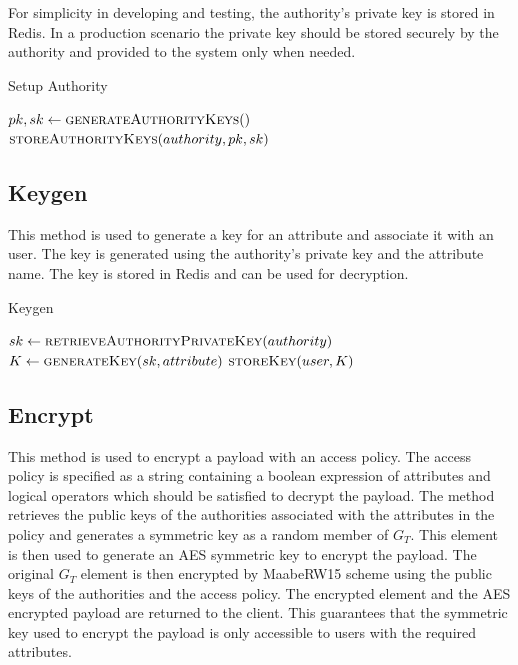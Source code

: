\documentclass[cic,tc,english]{iiufrgs}
\begin{document}
            For simplicity in developing and testing, the authority's private key is stored in Redis. In a production scenario the private key should be stored securely by the authority and provided to the system only when needed.

            \begin{algorithm}
                \caption{Setup Authority}
                \label{alg:setup_authority}
                \begin{algorithmic}[1]
                    \State $pk, sk \gets \textsc{generateAuthorityKeys}()$
                    \State $\textsc{storeAuthorityKeys}(authority, pk, sk)$
                \EndProcedure
                \end{algorithmic}
            \end{algorithm}

        \subsection{Keygen}
            This method is used to generate a key for an attribute and associate it with an user. The key is generated using the authority's private key and the attribute name. The key is stored in Redis and can be used for decryption.

            \begin{algorithm}
                \caption{Keygen}
                \label{alg:keygen}
                \begin{algorithmic}[1]
                    \State $sk \gets \textsc{retrieveAuthorityPrivateKey}(authority)$
                    \State $K \gets \textsc{generateKey}(sk, attribute)$
                    \State $\textsc{storeKey}(user, K)$
                \EndProcedure
                \end{algorithmic}
            \end{algorithm}


        \subsection{Encrypt}
            This method is used to encrypt a payload with an access policy. The access policy is specified as a string containing a boolean expression of attributes and logical operators which should be satisfied to decrypt the payload. The method retrieves the public keys of the authorities associated with the attributes in the policy and generates a symmetric key as a random member of $G_T$. This element is then used to generate an AES symmetric key to encrypt the payload. The original $G_T$ element is then encrypted by MaabeRW15 scheme using the public keys of the authorities and the access policy. The encrypted element and the AES encrypted payload are returned to the client. This guarantees that the symmetric key used to encrypt the payload is only accessible to users with the required attributes.
\end{document}
